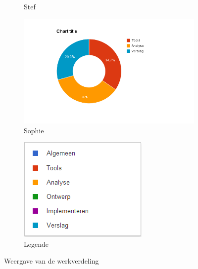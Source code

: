 \documentclass[i1]{oss}
\begin{document}
\begin{figure}[h!]
\begin{subfigure}[hb]{0.15\textwidth}
                \caption{Stef}
        \end{subfigure}%
        \begin{subfigure}[hb]{0.15\textwidth}
                \centering
                \includegraphics[width=\textwidth]{chart_5}
                \caption{Sophie}
        \end{subfigure}%
                \begin{subfigure}[hb]{0.15\textwidth}
                \centering
                \includegraphics[width=\textwidth]{legende}
                \caption{Legende}
        \end{subfigure}%


 \caption{Weergave van de werkverdeling}
\label{fig:werkverdeling}
\end{figure}
\end{document}
